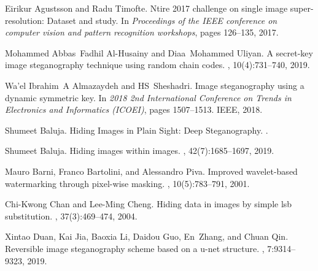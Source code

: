 \documentclass{article}
\begin{document}
\begin{thebibliography}{}
	
	Eirikur Agustsson and Radu Timofte.
	\newblock Ntire 2017 challenge on single image super-resolution: Dataset and
	study.
	\newblock In {\em Proceedings of the IEEE conference on computer vision and
		pattern recognition workshops}, pages 126--135, 2017.
	
	Mohammed Abbas~Fadhil Al-Husainy and Diaa~Mohammed Uliyan.
	\newblock A secret-key image steganography technique using random chain codes.
	, 10(4):731--740, 2019.
	
	Wa'el Ibrahim~A Almazaydeh and HS~Sheshadri.
	\newblock Image steganography using a dynamic symmetric key.
	\newblock In {\em 2018 2nd International Conference on Trends in Electronics
		and Informatics (ICOEI)}, pages 1507--1513. IEEE, 2018.
	
	Shumeet Baluja.
	\newblock Hiding {Images} in {Plain} {Sight}: Deep {Steganography}.
	.
	
	Shumeet Baluja.
	\newblock Hiding images within images.
	,
	42(7):1685--1697, 2019.
	
	Mauro Barni, Franco Bartolini, and Alessandro Piva.
	\newblock Improved wavelet-based watermarking through pixel-wise masking.
	, 10(5):783--791, 2001.
	
	Chi-Kwong Chan and Lee-Ming Cheng.
	\newblock Hiding data in images by simple lsb substitution.
	, 37(3):469--474, 2004.
	
	Xintao Duan, Kai Jia, Baoxia Li, Daidou Guo, En~Zhang, and Chuan Qin.
	\newblock Reversible image steganography scheme based on a u-net structure.
	, 7:9314--9323, 2019.
	

\end{thebibliography}
\end{document}
